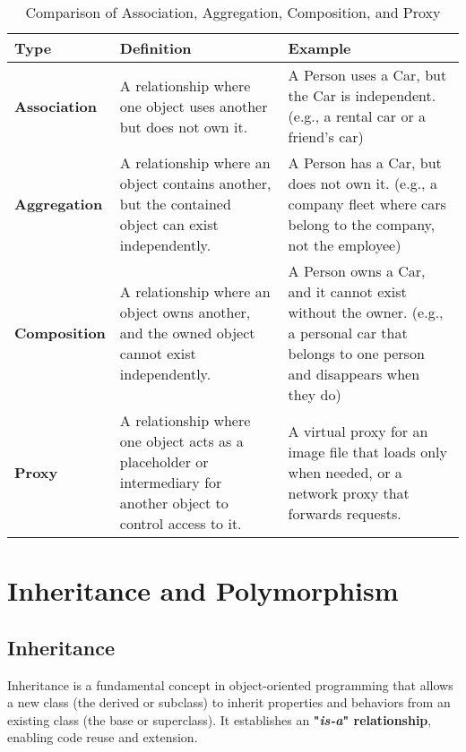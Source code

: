 \begin{table}[H]
    \centering
    \renewcommand{\arraystretch}{1.2}
    \begin{tabular}{|l|l|l|}
    \hline
    \hfill \textbf{Type} \hfill & \hfill \textbf{Definition} \hfill & \hfill \textbf{Example} \hfill \\
    \hline
    \textbf{Association} & A relationship where one object uses another but does not own it. & A Person uses a Car, but the Car is independent. (e.g., a rental car or a friend's car) \\
    \hline
    \textbf{Aggregation} & A relationship where an object contains another, but the contained object can exist independently. & A Person has a Car, but does not own it. (e.g., a company fleet where cars belong to the company, not the employee) \\
    \hline
    \textbf{Composition} & A relationship where an object owns another, and the owned object cannot exist independently. & A Person owns a Car, and it cannot exist without the owner. (e.g., a personal car that belongs to one person and disappears when they do) \\
    \hline
    \textbf{Proxy} & A relationship where one object acts as a placeholder or intermediary for another object to control access to it. & A virtual proxy for an image file that loads only when needed, or a network proxy that forwards requests. \\
    \hline
    \end{tabular}
    \caption{Comparison of Association, Aggregation, Composition, and Proxy}
    \label{tab:association_aggregation_composition_proxy}
    \end{table}
    

\newpage

\section{Inheritance and Polymorphism}

\subsection{Inheritance}

Inheritance is a fundamental concept in object-oriented programming that allows a new class (the derived or subclass) to inherit properties and behaviors from an existing class (the base or superclass). It establishes an \textbf{"\textit{is-a}" relationship}, enabling code reuse and extension.

